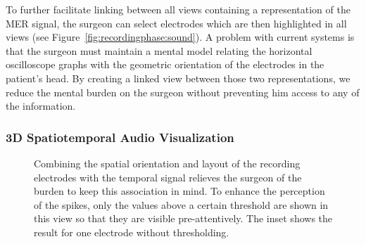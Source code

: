 \documentclass{vgtc}                          %
\begin{document}
To further facilitate linking between all views containing a representation of the MER signal, the surgeon can select electrodes which are then highlighted in all views (see Figure~\ref{fig:recordingphase:sound}). A problem with current systems is that the surgeon must maintain a mental model relating the horizontal oscilloscope graphs with the geometric orientation of the electrodes in the patient's head. By creating a linked view between those two representations, we reduce the mental burden on the surgeon without preventing him access to any of the information.

\subsubsection{3D Spatiotemporal Audio Visualization}\label{sec:overview:recording:3daudio}
\begin{figure}[t]
    \centering
    \caption{Combining the spatial orientation and layout of the recording electrodes with the temporal signal relieves the surgeon of the burden to keep this association in mind. To enhance the perception of the spikes, only the values above a certain threshold are shown in this view so that they are visible pre-attentively. The inset shows the result for one electrode without thresholding.}
    \label{fig:recordingphase:3dsound}
\end{figure}
\end{document}
